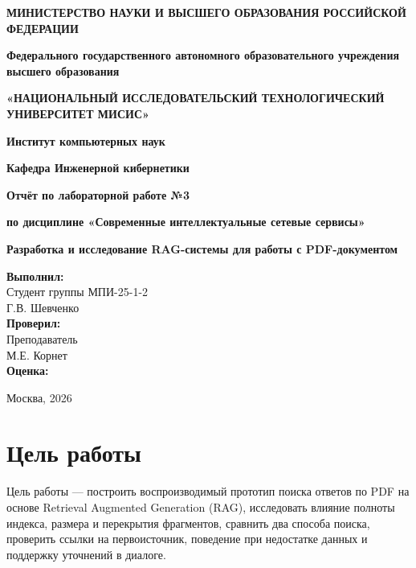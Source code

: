 \documentclass[12pt,a4paper]{article}
\begin{document}
\sloppy
\begin{titlepage}
\begin{center}
\textbf{МИНИСТЕРСТВО НАУКИ И ВЫСШЕГО ОБРАЗОВАНИЯ РОССИЙСКОЙ ФЕДЕРАЦИИ}
\vspace{0.5cm}

\textbf{Федерального государственного автономного образовательного учреждения высшего образования}
\vspace{0.3cm}

\textbf{«НАЦИОНАЛЬНЫЙ ИССЛЕДОВАТЕЛЬСКИЙ ТЕХНОЛОГИЧЕСКИЙ УНИВЕРСИТЕТ МИСИС»}
\vspace{2cm}

\textbf{Институт компьютерных наук}
\vspace{0.3cm}

\textbf{Кафедра Инженерной кибернетики}
\vspace{1cm}

\textbf{Отчёт по лабораторной работе №3}
\vspace{0.3cm}

\textbf{по дисциплине «Современные интеллектуальные сетевые сервисы»}
\vspace{1.5cm}

\LARGE{\textbf{Разработка и исследование RAG-системы для работы с PDF-документом}}
\vspace{2cm}
\end{center}
\begin{flushright}
\textbf{Выполнил:}\\
Студент группы МПИ-25-1-2\\
Г.В. Шевченко\\[0.5cm]
\textbf{Проверил:}\\
Преподаватель\\
М.Е. Корнет\\[1.5cm]
\textbf{Оценка:} \hrulefill
\end{flushright}
\vfill
\begin{center}Москва, 2026\end{center}
\end{titlepage}
\setcounter{page}{1}
\tableofcontents
\newpage
\section{Цель работы}
Цель работы --- построить воспроизводимый прототип поиска ответов по PDF на основе Retrieval Augmented Generation (RAG), исследовать влияние полноты индекса, размера и перекрытия фрагментов, сравнить два способа поиска, проверить ссылки на первоисточник, поведение при недостатке данных и поддержку уточнений в диалоге.
\end{document}
